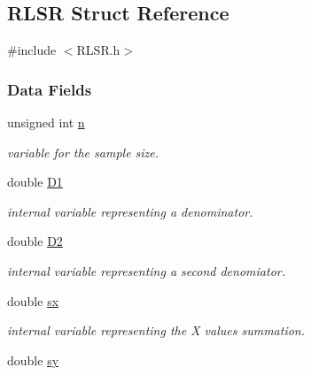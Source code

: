 \hypertarget{struct_r_l_s_r}{\subsection{R\+L\+S\+R Struct Reference}
\label{struct_r_l_s_r}
}


{\ttfamily \#include $<$R\+L\+S\+R.\+h$>$}

\subsubsection*{Data Fields}
\begin{DoxyCompactItemize}
\item 
\hypertarget{struct_r_l_s_r_a7d46b74409bd32b539089ef4721ea544}{unsigned int \hyperlink{struct_r_l_s_r_a7d46b74409bd32b539089ef4721ea544}{n}}\label{struct_r_l_s_r_a7d46b74409bd32b539089ef4721ea544}

\begin{DoxyCompactList}\small\item\em variable for the sample size. \end{DoxyCompactList}\item 
\hypertarget{struct_r_l_s_r_a98190861f5c5ac1bb59aaf713ede0023}{double \hyperlink{struct_r_l_s_r_a98190861f5c5ac1bb59aaf713ede0023}{D1}}\label{struct_r_l_s_r_a98190861f5c5ac1bb59aaf713ede0023}

\begin{DoxyCompactList}\small\item\em internal variable representing a denominator. \end{DoxyCompactList}\item 
\hypertarget{struct_r_l_s_r_a09d4b3eb759f7ace4ea7b734751de4d5}{double \hyperlink{struct_r_l_s_r_a09d4b3eb759f7ace4ea7b734751de4d5}{D2}}\label{struct_r_l_s_r_a09d4b3eb759f7ace4ea7b734751de4d5}

\begin{DoxyCompactList}\small\item\em internal variable representing a second denomiator. \end{DoxyCompactList}\item 
\hypertarget{struct_r_l_s_r_afdc197570c735e7e9eab5ee065500090}{double \hyperlink{struct_r_l_s_r_afdc197570c735e7e9eab5ee065500090}{sx}}\label{struct_r_l_s_r_afdc197570c735e7e9eab5ee065500090}

\begin{DoxyCompactList}\small\item\em internal variable representing the X values summation. \end{DoxyCompactList}\item 
\hypertarget{struct_r_l_s_r_a969933eb4ae8b2e39e355bf35e44fe42}{double \hyperlink{struct_r_l_s_r_a969933eb4ae8b2e39e355bf35e44fe42}{sy}}\label{struct_r_l_s_r_a969933eb4ae8b2e39e355bf35e44fe42}


\end{DoxyCompactItemize}
